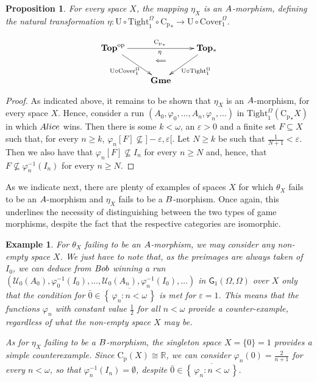 \documentclass[12pt]{amsart}
\newtheorem{prop}[thm]{Proposition}
\newtheorem{ex}[thm]{Example}
\theoremstyle{definition}
\newcommand{\set}[1]{\left\{\, {#1} \,\right\}}
\newcommand{\seq}[1]{{\left( {#1} \right)}}
\newcommand{\W}{{\Omega}}
\newcommand{\g}{\mathsf{G}}
\newcommand{\ali}{\textup{\textmd{\textsc{Alice}}}}
\newcommand{\bob}{\textup{\textmd{\textsc{Bob}}}}
\newcommand{\A}{\textup{\textmd{\textsc{A}}}}
\newcommand{\B}{\textup{\textmd{\textsc{B}}}}
\newcommand{\Cp}{\mathrm{C}_{\mathrm {p}}}
\newcommand{\mU}{{\mathcal{U}}}
\newcommand{\RR}{\mathbb{R}}
\newcommand{\CTop}{\mathbf{Top}}
\newcommand{\CTopp}{\mathbf{Top_\ast}}
\newcommand{\Gmes}{\mathbf{Gme}}
\newcommand{\op}{\mathrm{op}}
\newcommand{\Tight}{\mathrm{Tight}}
\newcommand{\Cover}{\mathrm{Cover}}
\begin{document}
\begin{prop}
	For every space $X$, the mapping $\eta_X$ is an $\A$-morphism, defining the natural transformation $\eta\colon \mathrm{U}\circ\Tight^\Omega_1\circ {\Cp}_* \longrightarrow \mathrm{U}\circ\Cover^\Omega_1$.
	
	\[
	\xymatrix{ \CTop^{\op}\ar[rr]^{{\Cp}_*}_\eta\ar[rd]_{\mathrm{U}\circ\Cover^\Omega_1}^{\qquad\;\;\,\Longleftarrow}			 && \CTopp\ar[ld]^{\mathrm{U}\circ\Tight^\Omega_1}		\\
		& \Gmes & \\
	}
	\]
	
\end{prop}
\begin{proof}
	As indicated above, it remains to be shown that $\eta_X$ is an $\A$-morphism, for every space $X$. Hence, consider a run $\seq{A_0, \varphi_0, \dotsc, A_n, \varphi_n,\dotsc}$ in $\Tight^\Omega_1({\Cp}_*X)$ in which $\ali$ wins. Then there is some $k<\omega$, an $\varepsilon>0$ and a finite set $F\subseteq X$ such that, for every $n\ge k$, $\varphi_n[F]\not\subseteq]-\varepsilon,\varepsilon[$. Let $N\ge k$ be such that $\frac{1}{N+1}<\varepsilon$. Then we also have that $\varphi_n[F]\not\subseteq I_n$ for every $n\ge N$ and, hence, that $F\not\subseteq \varphi_n^{-1}(I_n)$ for every $n\ge N$. 
\end{proof}

As we indicate next, there are plenty of examples of spaces $X$ for which $\theta_X$ fails to be an $\A$-morphism and $\eta_X$ fails to be a $\B$-morphism. Once again, this underlines the necessity of distinguishing between the two types of game morphisms, despite the fact that the respective categories are isomorphic.

\begin{ex}
	For $\theta_X$ failing to be an $\A$-morphism, we may consider any non-empty space $X$. We just have to note that, as the preimages are always  taken of $I_0$, we can deduce from $\bob$ winning a run $\seq{\mU_0(A_0), \varphi_0^{-1}(I_0), \dotsc, \mU_0(A_n),\varphi_n^{-1}(I_0), \dotsc}$ in $\g_1(\W,\W)$ over $X$ only that the condition for $\bar{0}\in \overline{\set{\varphi_n:n<\omega}}$ is met for $\varepsilon=1$. This means that  the functions $\varphi_n$ with constant value $ \frac{1}{2}$ for all $n<\omega$ provide a counter-example, regardless of what the non-empty space $X$ may be.
	
	As for $\eta_X$ failing to be a $\B$-morphism, the singleton space $X=\{0\}=1$ provides	 a simple counterexample. Since  $\Cp(X)\cong\RR$, we can consider $\varphi_n(0)= \frac{2}{n+1}$ for every $n<\omega$, so that $\varphi_n^{-1}(I_n)=\emptyset$, despite $\bar{0}\in \overline{\set{\varphi_n:n<\omega}}$.   
\end{ex}
\end{document}
